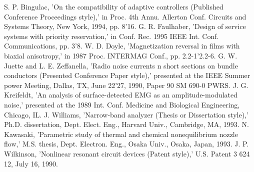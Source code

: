 \documentclass[letterpaper, 10 pt, conference]{ieeeconf}  %
\begin{document}
\begin{thebibliography}{99}
 S. P. Bingulac, 'On the compatibility of adaptive controllers (Published Conference Proceedings style),' in Proc. 4th Annu. Allerton Conf. Circuits and Systems Theory, New York, 1994, pp. 8'16.
 G. R. Faulhaber, 'Design of service systems with priority reservation,' in Conf. Rec. 1995 IEEE Int. Conf. Communications, pp. 3'8.
 W. D. Doyle, 'Magnetization reversal in films with biaxial anisotropy,' in 1987 Proc. INTERMAG Conf., pp. 2.2-1'2.2-6.
 G. W. Juette and L. E. Zeffanella, 'Radio noise currents n short sections on bundle conductors (Presented Conference Paper style),' presented at the IEEE Summer power Meeting, Dallas, TX, June 22'27, 1990, Paper 90 SM 690-0 PWRS.
 J. G. Kreifeldt, 'An analysis of surface-detected EMG as an amplitude-modulated noise,' presented at the 1989 Int. Conf. Medicine and Biological Engineering, Chicago, IL.
 J. Williams, 'Narrow-band analyzer (Thesis or Dissertation style),' Ph.D. dissertation, Dept. Elect. Eng., Harvard Univ., Cambridge, MA, 1993. 
 N. Kawasaki, 'Parametric study of thermal and chemical nonequilibrium nozzle flow,' M.S. thesis, Dept. Electron. Eng., Osaka Univ., Osaka, Japan, 1993.
 J. P. Wilkinson, 'Nonlinear resonant circuit devices (Patent style),' U.S. Patent 3 624 12, July 16, 1990. 






\end{thebibliography}
\end{document}
